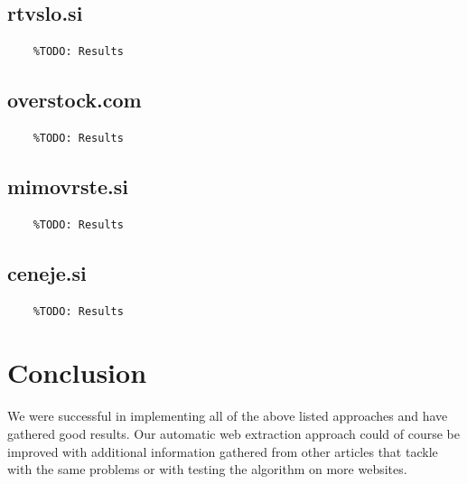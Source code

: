 \documentclass[9pt]{IEEEtran}
\begin{document}
\subsection{rtvslo.si}
\begin{verbatim}
	%TODO: Results
\end{verbatim}

\subsection{overstock.com}
\begin{verbatim}
	%TODO: Results
\end{verbatim}

\subsection{mimovrste.si}
\begin{verbatim}
	%TODO: Results
\end{verbatim}

\subsection{ceneje.si}
\begin{verbatim}
	%TODO: Results
\end{verbatim}

\section{Conclusion}

We were successful in implementing all of the above listed approaches and have gathered good results.
Our automatic web extraction approach could of course be improved with additional information gathered from other articles that tackle with the same problems or with testing the algorithm on more websites.



\end{document}
